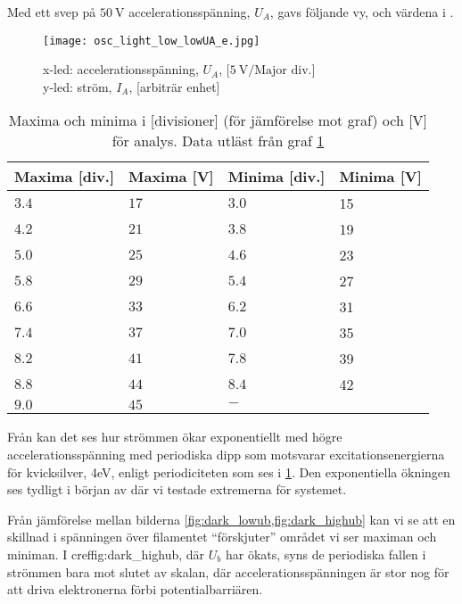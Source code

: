 Med ett svep på $50~\textrm{V}$ accelerationsspänning, $U_A$, gavs följande vy,  och värdena i .
\begin{figure}[h]
	\centering
	\texttt{[image: osc\_light\_low\_lowUA\_e.jpg]}
	\caption{x-led: accelerationsspänning, $U_A$, [$5~\textrm{V/Major div.}$]\\
			y-led: ström, $I_A$, [arbiträr enhet]}
	\label{fig:ollle}
\end{figure}

\begin{minipage}{\linewidth}
\begin{table}[H]
\centering
	\begin{tabular}{llll}
 	\textbf{Maxima [div.]}& \textbf{Maxima [V]}&\textbf{Minima [div.]}& \textbf{Minima [V]}\\\hline
	$3.4$&$17$&$3.0$&15\\
	$4.2$&$21$&$3.8$&19\\
	$5.0$&$25$&$4.6$&23\\
	$5.8$&$29$&$5.4$&27\\
	$6.6$&$33$&$6.2$&31\\
	$7.4$&$37$&$7.0$&35\\
	$8.2$&$41$&$7.8$&39\\
	$8.8$&$44$&$8.4$&42\\
	$9.0$&$45$&$ - $&
 	\end{tabular}
\caption{Maxima och minima i [divisioner] (för jämförelse mot graf) och [V] för analys. Data utläst från graf \cref{fig:ollle}}
\label{tab:maxmin}
\end{table}
\end{minipage}
\vspace{.5cm}

Från  kan det ses hur strömmen ökar exponentiellt med högre accelerationsspänning med periodiska dipp som motsvarar excitationsenergierna för kvicksilver, 4eV, enligt periodiciteten som ses i \cref{tab:maxmin}. Den exponentiella ökningen ses tydligt i början av  där vi testade extremerna för systemet.

Från jämförelse mellan bilderna \cref{fig:dark_lowub,fig:dark_highub} kan vi se att en skillnad i spänningen över filamentet ``förskjuter'' området vi ser maximan och miniman. I cref{fig:dark_highub}, där $U_b$ har ökats, syns de periodiska fallen i strömmen bara mot slutet av skalan, där accelerationsspänningen är stor nog för att driva elektronerna förbi potentialbarriären. 

